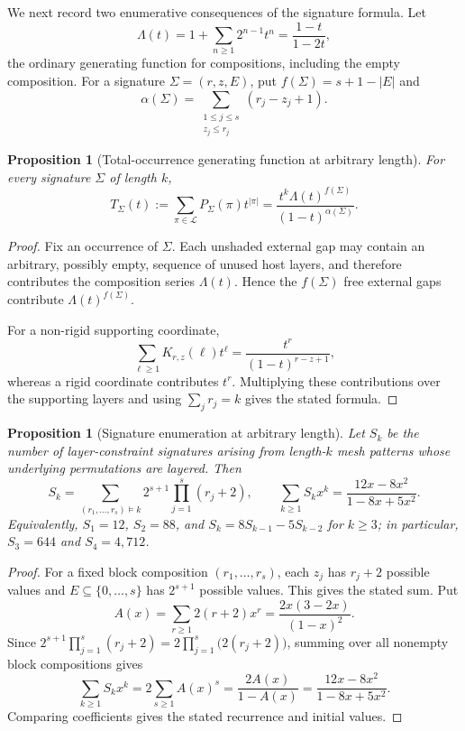 \documentclass[12pt]{article}
\newtheorem{prop}[thm]{Proposition}
\newcommand{\cL}{\mathcal L}
\begin{document}
We next record two enumerative consequences of the signature formula.  Let
\[
\Lambda(t)
=
1+\sum_{n\ge1}2^{n-1}t^n
=
\frac{1-t}{1-2t},
\]
the ordinary generating function for compositions, including the empty
composition.  For a signature $\Sigma=(r,z,E)$, put
$f(\Sigma)=s+1-|E|$ and
\[
\alpha(\Sigma)
=
\sum_{\substack{1\le j\le s\\ z_j\le r_j}}
(r_j-z_j+1).
\]

\begin{prop}[Total-occurrence generating function at arbitrary length]
\label{prop:total-occurrence}
For every signature $\Sigma$ of length $k$,
\[
T_\Sigma(t)
:=
\sum_{\pi\in\cL}P_\Sigma(\pi)t^{|\pi|}
=
\frac{t^k\Lambda(t)^{f(\Sigma)}}
     {(1-t)^{\alpha(\Sigma)}}.
\]
\end{prop}

\begin{proof}
Fix an occurrence of $\Sigma$.  Each unshaded external gap may contain an
arbitrary, possibly empty, sequence of unused host layers, and therefore
contributes the composition series $\Lambda(t)$.  Hence the $f(\Sigma)$ free
external gaps contribute $\Lambda(t)^{f(\Sigma)}$.

For a non-rigid supporting coordinate,
\[
\sum_{\ell\ge1}K_{r,z}(\ell)t^\ell
=
\frac{t^r}{(1-t)^{r-z+1}},
\]
whereas a rigid coordinate contributes $t^r$.  Multiplying these contributions
over the supporting layers and using $\sum_j r_j=k$ gives the stated formula.
\end{proof}

\begin{prop}[Signature enumeration at arbitrary length]
\label{prop:signature-enumeration}
Let $S_k$ be the number of layer-constraint signatures arising from
length-$k$ mesh patterns whose underlying permutations are layered.  Then
\[
S_k=
\sum_{(r_1,\ldots,r_s)\models k}
2^{s+1}\prod_{j=1}^s(r_j+2),
\qquad
\sum_{k\ge1}S_kx^k
=
\frac{12x-8x^2}{1-8x+5x^2}.
\]
Equivalently, $S_1=12$, $S_2=88$, and
$S_k=8S_{k-1}-5S_{k-2}$ for $k\ge3$; in particular,
$S_3=644$ and $S_4=4{,}712$.
\end{prop}

\begin{proof}
For a fixed block composition $(r_1,\ldots,r_s)$, each $z_j$ has
$r_j+2$ possible values and $E\subseteq\{0,\ldots,s\}$ has $2^{s+1}$
possible values.  This gives the stated sum.  Put
\[
A(x)=\sum_{r\ge1}2(r+2)x^r
=\frac{2x(3-2x)}{(1-x)^2}.
\]
Since
$2^{s+1}\prod_{j=1}^s(r_j+2)=2\prod_{j=1}^s\bigl(2(r_j+2)\bigr)$,
summing over all nonempty block compositions gives
\[
\sum_{k\ge1}S_kx^k
=2\sum_{s\ge1}A(x)^s
=\frac{2A(x)}{1-A(x)}
=\frac{12x-8x^2}{1-8x+5x^2}.
\]
Comparing coefficients gives the stated recurrence and initial values.
\end{proof}
\end{document}
